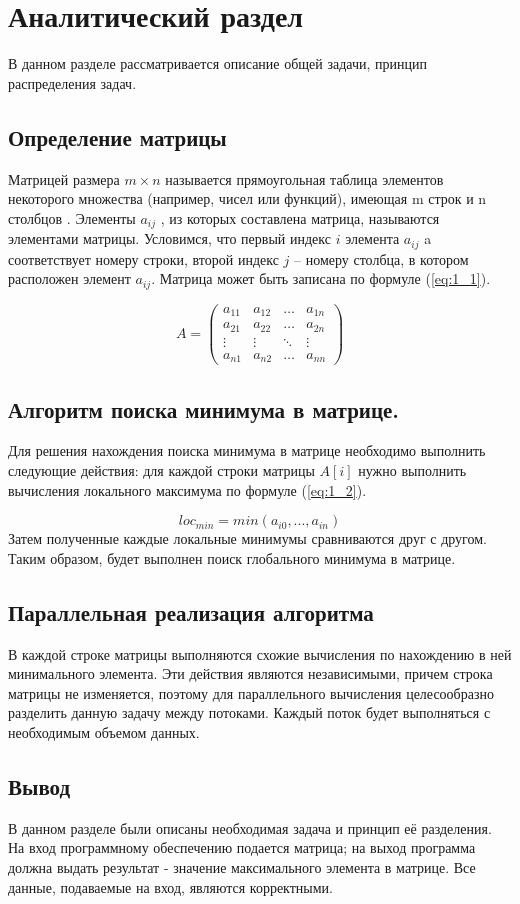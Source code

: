 \chapter{Аналитический раздел}

В данном разделе рассматривается описание общей задачи, принцип распределения задач.

\section{Определение матрицы}
Матрицей размера $m \times n$ называется прямоугольная таблица элементов некоторого множества 
(например, чисел или функций), имеющая m строк и n столбцов \cite{angem}.
Элементы $a_{ij}$ , из которых составлена матрица, называются элементами матрицы.
Условимся, что первый индекс $i$ элемента $a_{ij}$ a
соответствует номеру строки, второй индекс $j$ – номеру столбца, в котором расположен элемент $a_{ij}$.
Матрица может быть записана по формуле (\ref{eq:1_1}).

\begin{equation}
	A = \left(
	\begin{array}{cccc}
		a_{11} & a_{12} & \ldots & a_{1n} \\
		a_{21} & a_{22} & \ldots & a_{2n} \\
		\vdots & \vdots & \ddots & \vdots \\
		a_{n1} & a_{n2} & \ldots & a_{nn}
	\end{array}
	\right)
	\label{eq:1_1}
\end{equation}

\section{Алгоритм поиска минимума в матрице.}
Для решения нахождения поиска минимума в матрице необходимо выполнить следующие действия: для каждой строки матрицы $A[i]$ нужно выполнить вычисления локального максимума по формуле (\ref{eq:1_2}).

\begin{equation}
	loc_{min} = min(a_{i0}, ... , a_{in})
	\label{eq:1_2}
\end{equation}
Затем полученные каждые локальные минимумы сравниваются друг с другом. Таким образом, будет выполнен поиск глобального минимума в матрице.

\section{Параллельная реализация алгоритма}
В каждой строке матрицы выполняются схожие вычисления по нахождению в ней минимального элемента. Эти действия являются независимыми, причем строка матрицы не изменяется, поэтому для параллельного вычисления целесообразно разделить данную задачу между потоками. Каждый поток будет выполняться с необходимым объемом данных.

\section{Вывод}
В данном разделе были описаны необходимая задача и принцип её разделения. На вход программному обеспечению подается матрица; на выход программа должна выдать результат - значение максимального элемента в матрице. Все данные, подаваемые на вход, являются корректными. 